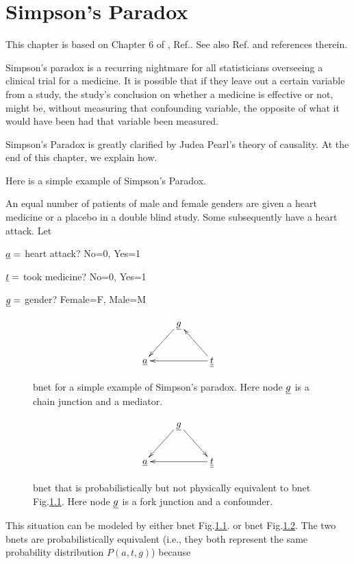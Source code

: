 \chapter{Simpson's Paradox}
\label{ch-simpson}
This chapter 
is based on Chapter 6 of 
, Ref.\cite{book-why}.
See also
Ref.\cite{wiki-simpson}
and references therein.


Simpson's paradox is a recurring 
nightmare for all statisticians 
overseeing a clinical trial for 
a medicine. It is possible that
 if they leave out a certain 
 variable from a study,
the study's conclusion on whether
 a medicine is effective or not, might be,
 without measuring that confounding variable, 
the opposite of what it would have 
been had that variable been measured.

Simpson's Paradox is greatly clarified
 by Judea Pearl's theory of causality.
 At the end of this chapter, 
we explain how.

Here is a simple example of 
Simpson's Paradox.

An equal 
number of  patients of male and 
female genders
 are given a heart medicine or a placebo 
in a double blind study.
 Some subsequently have a heart 
attack. Let

$ \ul{a}=$ heart attack? No=0, Yes=1

$ \ul{t}=$ took medicine? No=0, Yes=1

$ \ul{g}=$ gender? Female=F, Male=M



\begin{figure}[h!]
\centering
$$\xymatrix{
&\rvg\ar[dl]&\\
\rva&&\ul{\rvt}\ar[ul]\ar[ll]
}$$
\caption{bnet for a simple example of 
Simpson's paradox.
Here node $\rvg$ is 
a chain junction and a mediator.}
\label{fig-simpson-chain}
\end{figure}

\begin{figure}[h!]
\centering
$$\xymatrix{
&\rvg\ar[dl]\ar[dr]&\\
\rva&&\ul{\rvt}\ar[ll]
}$$
\caption{bnet that is probabilistically
but not physically
equivalent to bnet
Fig.\ref{fig-simpson-chain}.
Here node $\rvg$ is 
a fork junction and a confounder.}
\label{fig-simpson-fork}
\end{figure}




This situation can be modeled by 
either
bnet Fig.\ref{fig-simpson-chain}.
or bnet
 Fig.\ref{fig-simpson-fork}.
The two bnets are 
probabilistically
equivalent 
(i.e., they
both represent the same
probability distribution $P(a, t, g)$)
because

